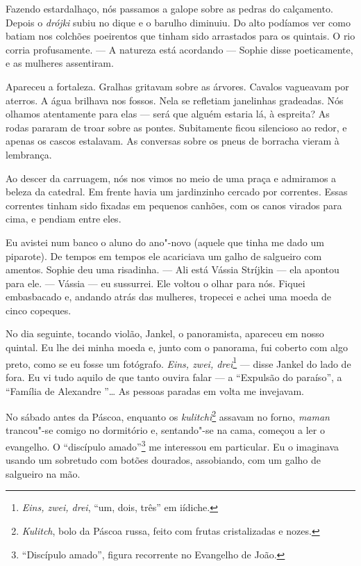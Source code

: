Fazendo estardalhaço, nós passamos a galope sobre as pedras do
calçamento. Depois o \emph{drójki} subiu no dique e o barulho diminuiu.
Do alto podíamos ver como batiam nos colchões poeirentos que tinham sido
arrastados para os quintais. O rio corria profusamente. --- A natureza
está acordando --- Sophie disse poeticamente, e as mulheres assentiram.

Apareceu a fortaleza. Gralhas gritavam sobre as árvores. Cavalos
vagueavam por aterros. A água brilhava nos fossos. Nela se refletiam
janelinhas gradeadas. Nós olhamos atentamente para elas --- será que
alguém estaria lá, à espreita? As rodas pararam de troar sobre as
pontes. Subitamente ficou silencioso ao redor, e apenas os cascos
estalavam. As conversas sobre os pneus de borracha vieram à lembrança.

Ao descer da carruagem, nós nos vimos no meio de uma praça e admiramos a
beleza da catedral. Em frente havia um jardinzinho cercado por
correntes. Essas correntes tinham sido fixadas em pequenos canhões, com
os canos virados para cima, e pendiam entre eles.

Eu avistei num banco o aluno do ano"-novo (aquele que tinha me dado um
piparote). De tempos em tempos ele acariciava um galho de salgueiro com
amentos. Sophie deu uma risadinha. --- Ali está Vássia Stríjkin --- ela
apontou para ele. --- Vássia --- eu sussurrei. Ele voltou o olhar para
nós. Fiquei embasbacado e, andando atrás das mulheres, tropecei e achei
uma moeda de cinco copeques.

No dia seguinte, tocando violão, Jankel, o panoramista, apareceu em
nosso quintal. Eu lhe dei minha moeda e, junto com o panorama, fui
coberto com algo preto, como se eu fosse um fotógrafo. \emph{Eins, zwei,
drei}\footnote{\emph{Eins, zwei, drei}, ``um, dois, três'' em iídiche.}
--- disse Jankel do lado de fora. Eu vi tudo aquilo de que tanto ouvira
falar --- a ``Expulsão do paraíso'', a ``Família de Alexandre \scalebox{.8}{III}''\ldots{}
As pessoas paradas em volta me invejavam.

No sábado antes da Páscoa, enquanto os \emph{kulitchi}\footnote{\emph{Kulitch},
  bolo da Páscoa russa, feito com frutas cristalizadas e nozes.} assavam
no forno, \emph{maman} trancou"-se comigo no dormitório e, sentando"-se na
cama, começou a ler o evangelho. O ``discípulo amado''\footnote{``Discípulo
  amado'', figura recorrente no Evangelho de João.} me interessou em
particular. Eu o imaginava usando um sobretudo com botões dourados,
assobiando, com um galho de salgueiro na mão.

